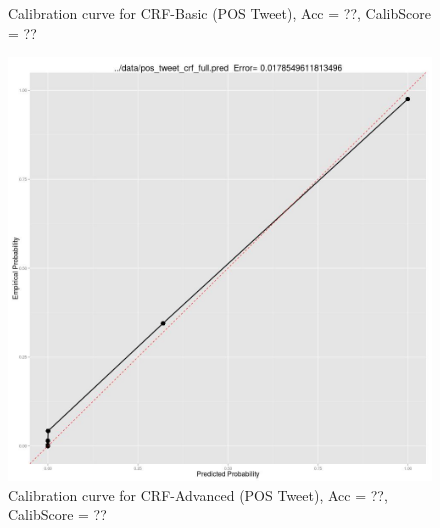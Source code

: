 \begin{figure}[t]
  \caption{Calibration curve for CRF-Basic (POS Tweet), Acc = ??, CalibScore = ??}
  \label{fig:pos_tweet_crf_pred} 
\endminipage\hfill
{}
  \includegraphics[width=\linewidth]{pos_tweet_crf_advanced_pred.jpg}
  \caption{Calibration curve for CRF-Advanced (POS Tweet), Acc = ??, CalibScore = ??}
  \label{fig:pos_tweet_advanced_crf_pred} 
\endminipage
\end{figure}

